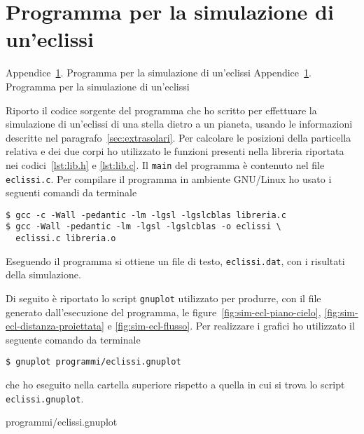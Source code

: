 \clearpage{}
\chapter{Programma per la simulazione di un'eclissi}
\label{cha:simulazione-eclissi}
\markboth%
{Appendice~\ref{cha:simulazione-eclissi}. Programma per la simulazione di
  un'eclissi}%
{Appendice~\ref{cha:simulazione-eclissi}. Programma per la simulazione di
  un'eclissi}

Riporto il codice sorgente del programma che ho scritto per effettuare la
simulazione di un'eclissi di una stella dietro a un pianeta, usando le
informazioni descritte nel paragrafo~\ref{sec:extrasolari}. Per calcolare le
posizioni della particella relativa e dei due corpi ho utilizzato le funzioni
presenti nella libreria riportata nei codici~\ref{lst:lib.h} e
\ref{lst:lib.c}. Il \verb|main| del programma è contenuto nel file
\verb|eclissi.c|. Per compilare il programma in ambiente GNU/Linux ho usato i
seguenti comandi da terminale
\begin{verbatim}
$ gcc -c -Wall -pedantic -lm -lgsl -lgslcblas libreria.c
$ gcc -Wall -pedantic -lm -lgsl -lgslcblas -o eclissi \
  eclissi.c libreria.o
\end{verbatim}
Eseguendo il programma si ottiene un file di testo, \verb|eclissi.dat|, con i
risultati della simulazione.
% 

Di seguito è riportato lo script \verb|gnuplot| utilizzato per produrre, con il
file generato dall'esecuzione del programma, le
figure~\ref{fig:sim-ecl-piano-cielo}, \ref{fig:sim-ecl-distanza-proiettata} e
\ref{fig:sim-ecl-flusso}. Per realizzare i grafici ho utilizzato il seguente
comando da terminale
\begin{verbatim}
$ gnuplot programmi/eclissi.gnuplot
\end{verbatim}
che ho eseguito nella cartella superiore rispetto a quella in cui si trova lo
script \verb|eclissi.gnuplot|.

{programmi/eclissi.gnuplot}

